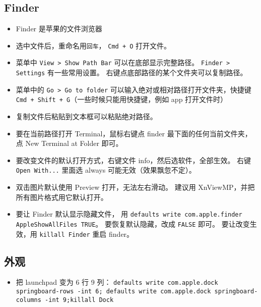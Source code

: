 \subsection{Finder}
\begin{itemize}
\item Finder 是苹果的文件浏览器
\item 选中文件后，重命名用\verb`回车`， \verb`Cmd + O` 打开文件。
\item 菜单中 \verb`View > Show Path Bar` 可以在底部显示完整路径。 \verb`Finder > Settings` 有一些常用设置。 右键点底部路径的某个文件夹可以复制路径。
\item 菜单中的 \verb`Go > Go to folder` 可以输入绝对或相对路径打开文件夹，快捷键 \verb`Cmd + Shift + G`（一些时候只能用快捷键，例如 app 打开文件时）
\item 复制文件后粘贴到文本框可以粘贴绝对路径。
\item 要在当前路径打开 Terminal，鼠标右键点 finder 最下面的任何当前文件夹，点 New Terminal at Folder 即可。
\item 要改变文件的默认打开方式，右键文件 info，然后选软件，全部生效。 右键 \verb`Open With...` 里面选 always 可能无效（效果飘忽不定）。
\item 双击图片默认使用 Preview 打开，无法左右滑动。 建议用 XnViewMP，并把所有图片格式用它默认打开。
\item 要让 Finder 默认显示隐藏文件， 用 \verb`defaults write com.apple.finder AppleShowAllFiles TRUE`。 要恢复默认隐藏，改成 \verb`FALSE` 即可。 要让改变生效，用 \verb`killall Finder` 重启 finder。
\end{itemize}

\subsection{外观}
\begin{itemize}
\item 把 launchpad 变为 6 行 9 列： \verb`defaults write com.apple.dock springboard-rows -int 6; defaults write com.apple.dock springboard-columns -int 9;killall Dock`
\end{itemize}

